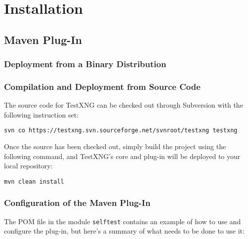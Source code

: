 %

\chapter{Installation}

\section{Maven Plug-In}

\subsection{Deployment from a Binary Distribution}

\subsection{Compilation and Deployment from Source Code}

The source code for TestXNG can be checked out through Subversion with the following instruction set:
\begin{verbatim}
svn co https://testxng.svn.sourceforge.net/svnroot/testxng testxng
\end{verbatim}
Once the source has been checked out, simply build the project using the following command, and TestXNG's core and plug-in will be deployed to your local repository:
\begin{verbatim}
mvn clean install
\end{verbatim}

\subsection{Configuration of the Maven Plug-In}

The POM file in the module {\tt selftest} contains an example of how to use and configure the plug-in, but here's a summary of what needs to be done to use it:

